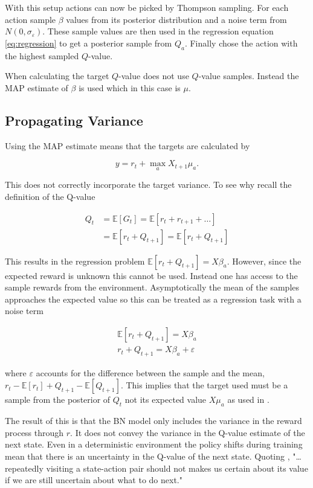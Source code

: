 With this setup actions can now be picked by Thompson sampling. For each action sample $\beta$ values from its posterior distribution and a noise term from $N(0, \sigma_\varepsilon)$. These sample values are then used in the regression equation \ref{eq:regression} to get a posterior sample from $Q_a$. Finally chose the action with the highest sampled $Q$-value. 

When calculating the target $Q$-value \cite{azziz_2018} does not use $Q$-value samples. Instead the MAP estimate of $\beta$ is used which in this case is $\mu$.


\subsection{Propagating Variance}

Using the MAP estimate means that the targets are calculated by 

$$
y = r_t + \max_a X_{t+1}\mu_a.
$$

This does not correctly incorporate the target variance. To see why recall the definition of the Q-value

\begin{align*}
    Q_t &= \mathbb{E}[G_t] = \mathbb{E}[r_t + r_{t+1} + \dots] \\
    &= \mathbb{E}[r_t + Q_{t+1}] = \mathbb{E}[r_t + Q_{t+1}]
\end{align*}

This results in the regression problem $\mathbb{E}[r_t + Q_{t+1}] = X\beta_a$. However, since the expected reward is unknown this cannot be used. Instead one has access to the sample rewards from the environment. Asymptotically the mean of the samples approaches the expected value so this can be treated as a regression task with a noise term

\begin{align*}
    \mathbb{E}[r_t + Q_{t+1}] = X\beta_a \\
    r_t + Q_{t+1} = X\beta_a + \varepsilon
\end{align*}

where $\varepsilon$ accounts for the difference between the sample and the mean, $r_t - \mathbb{E}[r_t] + Q_{t+1} - \mathbb{E}[Q_{t+1}]$. This implies that the target used must be a sample from the posterior of $Q_t$ not its expected value $X\mu_a$ as used in \cite{azziz_2018}. 

The result of this is that the BN model only includes the variance in the reward process through $r$. It does not convey the variance in the Q-value estimate of the next state. Even in a deterministic environment the policy shifts during training mean that there is an uncertainty in the Q-value of the next state. Quoting \cite{moerland_2017},  "\dots repeatedly visiting a state-action pair should not makes us certain about its value if we are still uncertain about what to do next."

